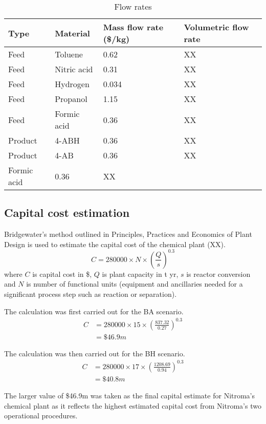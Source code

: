 \begin{table}[h] 
\centering
\caption{Flow rates}
\label{tab:material-prices}
\begin{tabular}{llll}
    \toprule
    Type    & Material      & Mass flow rate (\$/kg) & Volumetric flow rate \\ \midrule
    Feed    & Toluene     & 0.62          & XX        \\
    Feed    & Nitric acid & 0.31          & XX        \\
    Feed    & Hydrogen    & 0.034         & XX        \\
    Feed    & Propanol    & 1.15          & XX        \\
    Feed    & Formic acid & 0.36          & XX        \\ 
    Product & 4-ABH       & 0.36          & XX        \\
    Product & 4-AB & 0.36          & XX        \\
    Formic acid & 0.36          & XX        \\\bottomrule
\end{tabular}
\end{table}

\subsection{Capital cost estimation}

Bridgewater's method outlined in Principles, Practices and Economics of Plant Design is used to estimate the capital cost of the chemical plant (XX).
\begin{equation}
    C= \num{280000} \times N \times \left(\frac{Q}{s}\right)^{0.3}
\end{equation}
where $C$ is capital cost in \$, $Q$ is  plant capacity in t yr, $s$ is reactor conversion and $N$ is number of functional units (equipment and ancillaries needed for a significant process step such as reaction or separation).

The calculation was first carried out for the BA scenario.
\begin{align*}
C &= \num{280000} \times 15 \times \left(\frac{837.32}{0.27}\right)^{0.3}  \\
  &= \$46.9m 
\end{align*}
 
The calculation was then carried out for the BH scenario.
\begin{align*}
C &= 280000 \times 17 \times \left(\frac{1208.69}{0.94}\right)^{0.3}  \\
  &=\$40.8m 
\end{align*}

The larger value of \$46.9m was taken as the final capital estimate for Nitroma's chemical plant as it reflects the highest estimated capital cost from Nitroma's two operational procedures.
